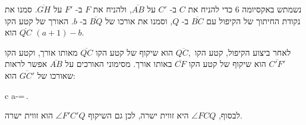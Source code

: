 נשמתש באקסיומה $6$ כדי להניח את 
$C$
ב-%
$C'$
על
$\overline{AB}$,
ולהניח את
$F$
ב-%
$F'$
על
$\overline{GH}$.
סמנו את נקודת החיתוך של הקיפול עם
$\overline{BC}$ 
ב-%
$Q$,
וסמנו את אורכו של
$\overline{BQ}$
ב-%
$b$.
האורך של קטע הקו 
$\overline{QC}$
הוא
$(a+1)-b$.


לאחר ביצוע הקיפול, קטע הקו
$\overline{QC,}$
הוא שיקוף של קטע הקו
$\overline{QC}$
מאותו אורך, וקטע הקו
$\overline{C'F'}$
הוא שיקוף של קטע הקו
$\overline{CF}$
באותו אורך. מסימוני האורכים על
$\overline{AB}$
אפשר לראות שאורכו של
$\overline{GC'}$
הוא:
\erh{0pt}
\begin{equationarray}{c}
a-=\,.\label{eq.one-third}
\end{equationarray}
לבסוף,
$\angle FCQ$
היא זווית ישרה, לכן גם השיקוף
$\angle F'C'Q$ 
הוא זווית ישרה.


